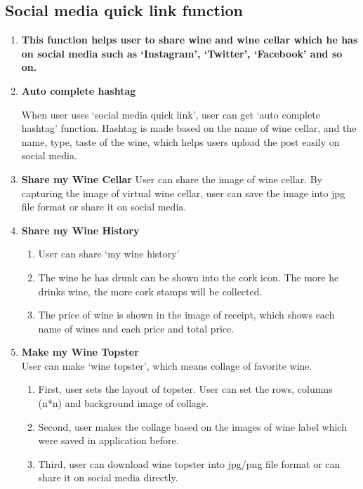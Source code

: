 \documentclass[sigconf, nonacm]{acmart}
\begin{document}
\subsection{Social media quick link function}
\begin{enumerate}
    \item \textbf{This function helps user to share wine and wine cellar which he
has on social media such as ‘Instagram’, ‘Twitter’, ‘Facebook’
and so on.\\}

\item \textbf{Auto complete hashtag}

When user uses ‘social media quick link’, user can get ‘auto
complete hashtag’ function. Hashtag is made based on the
name of wine cellar, and the name, type, taste of the wine,
which helps users upload the post easily on social media.\\

\item \textbf{Share my Wine Cellar}
  User can share the image of wine cellar. By capturing the
image of virtual wine cellar, user can save the image into jpg
file format or share it on social media.\\

\item \textbf{Share my Wine History}
\begin{enumerate}
    \item User can share ‘my wine history’
    \item The wine he has drunk can be shown into the cork icon.
The more he drinks wine, the more cork stamps will be
collected.
    \item The price of wine is shown in the image of receipt, which
shows each name of wines and each price and total price.\\
\end{enumerate}

\item \textbf{Make my Wine Topster\\}
User can make ‘wine topster’, which means collage of
favorite wine.
\begin{enumerate}
    \item First, user sets the layout of topster. User can set the
rows, columns (n*n) and background image of collage.
\item Second, user makes the collage based on the images
of wine label which were saved in application before.
\item Third, user can download wine topster into jpg/png
file format or can share it on social media directly.
\end{enumerate}
\end{enumerate}
\end{document}
